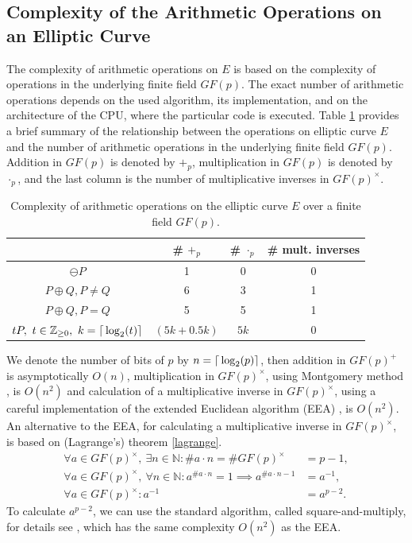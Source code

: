 \documentclass[thesis=M,english]{FITthesis}[2012/10/20]
\theoremstyle{remark}
\theoremstyle{definition}
\begin{document}
\subsection{Complexity of the Arithmetic Operations on an Elliptic Curve} 
The complexity of arithmetic operations on $E$ is based on the complexity of operations in the underlying finite field $GF(p)$. The exact number of arithmetic operations depends on the used algorithm, its implementation, and on the architecture of the CPU, where the particular code is executed. Table \ref{tblComp} provides a brief summary of the relationship between the operations on elliptic curve $E$ and the number of arithmetic operations in the underlying finite field $GF(p)$. Addition in $GF(p)$ is denoted by $+_p$, multiplication in $GF(p)$ is denoted by $\cdot_p$, and the last column is the number of multiplicative inverses in $GF(p)^{\times}$.
\begin{table}[H]
\centering
\begin{tabular}{ |c||c|c|c| } 
 \hline
 & \# $+_p$ & \# $\cdot_p$ & \# mult. inverses \\ 
 \hline
 \hline
$\ominus P$ & 1 & 0 & 0  \\  \hline
$P \oplus Q, P \neq Q$ & 6 & 3 & 1 \\  \hline
$P \oplus Q, P = Q$ & 5 & 5 & 1 \\  \hline
$tP,\ t \in \mathbb{Z}_{\geq 0},\ k = \mathlarger{\lceil} \log_2(t) \mathlarger{\rceil}$ & $ (5k + 0.5k)$\footnotemark & $5k$ & 0 \\ \hline
\end{tabular}
\caption[Complexity of arithmetic operations on $E$]{Complexity of arithmetic operations on the elliptic curve $E$ over a finite field $GF(p)$.}
\label{tblComp}
\end{table}
\noindent We denote the number of bits of $p$ by $n = \mathlarger{\lceil} \log_2(p) \mathlarger{\rceil}$, then addition in $GF(p)^{+}$ is asymptotically $O(n)$, multiplication in $GF(p)^{\times}$, using Montgomery method \cite{handbook}, is $O(n^2)$ and calculation of a multiplicative inverse in $GF(p)^{\times}$, using a careful implementation of the extended Euclidean algorithm (EEA) \cite{handbook}, is $O(n^2)$. An alternative to the EEA, for calculating a multiplicative inverse in $GF(p)^{\times}$, is based on (Lagrange's) theorem \ref{lagrange}. 
\begin{align*}
\forall a \in GF(p)^{\times},\ \exists n \in \mathbb{N}: \#a \cdot n = \#GF(p)^{\times} &= p - 1, \\ 
\forall a \in GF(p)^{\times},\ \forall n \in \mathbb{N}: a^{\#a \cdot n} = 1 \implies a^{\#a \cdot n - 1} &= a^{-1}, \\
\forall a \in GF(p)^{\times}: a^{-1} &= a^{p-2}.
\end{align*}
To calculate $a^{p-2}$, we can use the standard algorithm, called square-and-multiply, for details see \cite{mky}, which has the same complexity $O(n^2)$ as the EEA.
\end{document}
